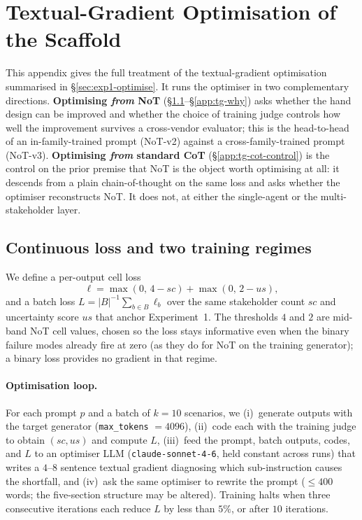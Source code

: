 \documentclass[11pt]{article}
\begin{document}
\section{Textual-Gradient Optimisation of the Scaffold}
\label{app:textgrad}

This appendix gives the full treatment of the textual-gradient
optimisation summarised in \S\ref{sec:exp1-optimise}. It runs the
optimiser in two complementary directions. \textbf{Optimising
\emph{from} NoT} (\S\ref{app:tg-method}--\S\ref{app:tg-why}) asks
whether the hand design can be improved and whether the choice of
training judge controls how well the improvement survives a
cross-vendor evaluator; this is the head-to-head of an in-family-trained
prompt (NoT-v2) against a cross-family-trained prompt (NoT-v3).
\textbf{Optimising \emph{from} standard CoT}
(\S\ref{app:tg-cot-control}) is the control on the prior premise that
NoT is the object worth optimising at all: it descends from a plain
chain-of-thought on the same loss and asks whether the optimiser
reconstructs NoT. It does not, at either the single-agent or the
multi-stakeholder layer.

\subsection{Continuous loss and two training regimes}
\label{app:tg-method}

We define a per-output cell loss
\begin{equation}
  \ell = \max(0,\, 4 - \mathit{sc}) + \max(0,\, 2 - \mathit{us}),
  \label{eq:tgloss}
\end{equation}
and a batch loss $L = |B|^{-1}\sum_{b \in B} \ell_b$ over the same
stakeholder count $\mathit{sc}$ and uncertainty score $\mathit{us}$ that
anchor Experiment~1. The thresholds $4$ and $2$ are mid-band NoT cell
values, chosen so the loss stays informative even when the binary
failure modes already fire at zero (as they do for NoT on the training
generator); a binary loss provides no gradient in that regime.

\paragraph{Optimisation loop.} For each prompt $p$ and a batch of
$k = 10$ scenarios, we (i)~generate outputs with the target generator
(\texttt{max\_tokens} $=4096$), (ii)~code each with the training judge
to obtain $(\mathit{sc}, \mathit{us})$ and compute $L$, (iii)~feed the
prompt, batch outputs, codes, and $L$ to an optimiser LLM
(\texttt{claude-sonnet-4-6}, held constant across runs) that writes a
$4$--$8$ sentence textual gradient diagnosing which sub-instruction
causes the shortfall, and (iv)~ask the same optimiser to rewrite the
prompt ($\leq 400$ words; the five-section structure may be altered).
Training halts when three consecutive iterations each reduce $L$ by
less than $5\%$, or after $10$ iterations.
\end{document}
